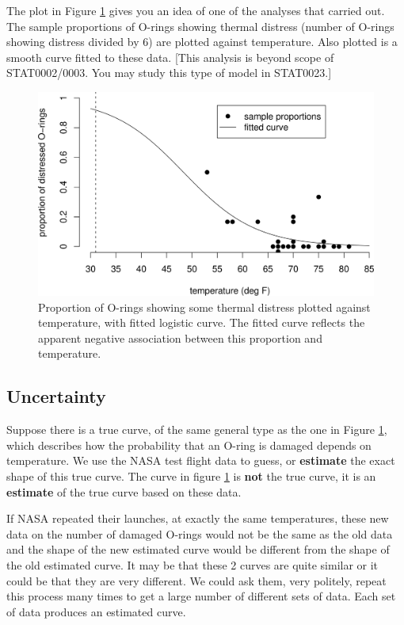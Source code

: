 \documentclass[
  british,
]{book}
\begin{document}
The plot in Figure \ref{fig:shuttle3} gives you an idea of one of the analyses that \citet{shuttle} carried out. The sample proportions
of O-rings showing thermal distress (number of O-rings showing distress divided by 6) are plotted against temperature. Also plotted is a smooth curve fitted to these data. {[}This analysis is beyond scope of STAT0002/0003. You may study this type of model in STAT0023.{]}

\begin{figure}

{\centering \includegraphics[width=0.8\linewidth]{images/shuttle3} 

}

\caption{Proportion of O-rings showing some thermal distress plotted against temperature, with fitted logistic curve.  The fitted curve reflects the apparent negative association between this proportion and temperature.}\label{fig:shuttle3}
\end{figure}

\hypertarget{uncertainty}{%
\subsection{Uncertainty}\label{uncertainty}}

Suppose there is a true curve, of the same general type as the one in Figure \ref{fig:shuttle3}, which describes how the probability that an O-ring is damaged depends on temperature. We use the NASA test flight data to guess, or \textbf{estimate} the exact shape of this true curve. The curve in figure \ref{fig:shuttle3} is \textbf{not} the true curve, it is an \textbf{estimate} of the true curve based on these data.

If NASA repeated their launches, at exactly the same temperatures, these new data on the number of damaged O-rings would not be the same as the old data and the shape of the new estimated curve would be different from the shape of the old estimated curve. It may be that these 2 curves are quite similar or it could be that they are very different. We could ask them, very politely, repeat this process many times to get a large number of different sets of data. Each set of data produces an estimated curve.
\end{document}
